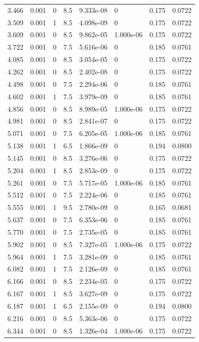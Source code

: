 \documentclass[preview]{standalone}
\begin{document}
{{\begin{tabular}{L{1.2cm}C{1.2cm} C{0.3cm}C{0.5cm} C{1.4cm}C{1.4cm} C{1.4cm}C{1.4cm}}
  3.466  &  0.001  & 0     & 8.5 &  9.333e-08  & 0  & 0.175 &  0.0722   \\ 
  3.509  &  0.001  & 1     & 8.5 &  4.098e-09  & 0  & 0.175 &  0.0722   \\ 
  3.609  &  0.001  & 0     & 8.5 &  9.862e-05  & 1.000e-06  & 0.175 &  0.0722   \\ 
  3.722  &  0.001  & 0     & 7.5 &  5.616e-06  & 0  & 0.185 &  0.0761   \\ 
  4.085  &  0.001  & 0     & 8.5 &  3.054e-05  & 0  & 0.175 &  0.0722   \\ 
  4.262  &  0.001  & 0     & 8.5 &  2.402e-08  & 0  & 0.175 &  0.0722   \\ 
  4.498  &  0.001  & 0     & 7.5 &  2.294e-06  & 0  & 0.185 &  0.0761   \\ 
  4.602  &  0.001  & 1     & 7.5 &  3.979e-09  & 0  & 0.185 &  0.0761   \\ 
  4.856  &  0.001  & 0     & 8.5 &  8.989e-05  & 1.000e-06  & 0.175 &  0.0722   \\ 
  4.981  &  0.001  & 0     & 8.5 &  2.841e-07  & 0  & 0.175 &  0.0722   \\ 
  5.071  &  0.001  & 0     & 7.5 &  6.205e-05  & 1.000e-06  & 0.185 &  0.0761   \\ 
  5.138  &  0.001  & 1     & 6.5 &  1.866e-09  & 0  & 0.194 &  0.0800   \\ 
  5.145  &  0.001  & 0     & 8.5 &  3.276e-06  & 0  & 0.175 &  0.0722   \\ 
  5.204  &  0.001  & 1     & 8.5 &  2.853e-09  & 0  & 0.175 &  0.0722   \\ 
  5.261  &  0.001  & 0     & 7.5 &  5.717e-05  & 1.000e-06  & 0.185 &  0.0761   \\ 
  5.512  &  0.001  & 0     & 7.5 &  2.224e-06  & 0  & 0.185 &  0.0761   \\ 
  5.555  &  0.001  & 1     & 9.5 &  2.780e-09  & 0  & 0.165 &  0.0681   \\ 
  5.637  &  0.001  & 0     & 7.5 &  6.353e-06  & 0  & 0.185 &  0.0761   \\ 
  5.770  &  0.001  & 0     & 7.5 &  2.735e-05  & 0  & 0.185 &  0.0761   \\ 
  5.902  &  0.001  & 0     & 8.5 &  7.327e-05  & 1.000e-06  & 0.175 &  0.0722   \\ 
  5.964  &  0.001  & 1     & 7.5 &  3.281e-09  & 0  & 0.185 &  0.0761   \\ 
  6.082  &  0.001  & 1     & 7.5 &  2.126e-09  & 0  & 0.185 &  0.0761   \\ 
  6.166  &  0.001  & 0     & 8.5 &  2.234e-05  & 0  & 0.175 &  0.0722   \\ 
  6.167  &  0.001  & 1     & 8.5 &  3.627e-09  & 0  & 0.175 &  0.0722   \\ 
  6.187  &  0.001  & 1     & 6.5 &  2.155e-09  & 0  & 0.194 &  0.0800   \\ 
  6.216  &  0.001  & 0     & 8.5 &  5.363e-06  & 0  & 0.175 &  0.0722   \\ 
  6.344  &  0.001  & 0     & 8.5 &  1.326e-04  & 1.000e-06  & 0.175 &  0.0722   \\ 
\hline 
\end{tabular} 

}}
\end{document}

